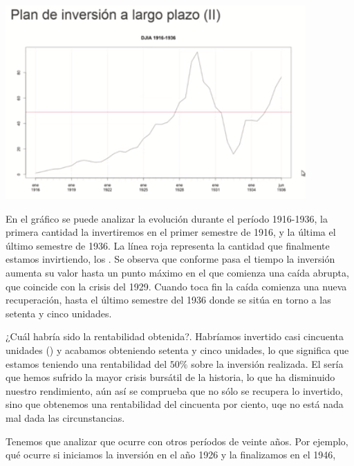 \begin{center}
    \includegraphics[scale=.65]{images/mod03-05.png}
\end{center}
En el gráfico se puede analizar la evolución durante el período 1916-1936, la primera cantidad la invertiremos en el primer semestre de 1916, y la última el último semestre de 1936. La línea roja representa la cantidad que finalmente estamos invirtiendo, los . Se observa que conforme pasa el tiempo la inversión aumenta su valor hasta un punto máximo en el que comienza una caída abrupta, que coincide con la crisis del 1929. Cuando toca fin la caída comienza una nueva recuperación, hasta el último semestre del 1936 donde se sitúa en torno a las setenta y cinco unidades.

¿Cuál habría sido la rentabilidad obtenida?. Habríamos invertido casi cincuenta unidades () y acabamos obteniendo setenta y cinco unidades, lo que significa que estamos teniendo una rentabilidad del $50\%$ sobre la inversión realizada. El  sería que hemos sufrido la mayor crisis bursátil de la historia, lo que ha disminuido nuestro rendimiento, aún así se comprueba que no sólo se recupera lo invertido, sino que obtenemos una rentabilidad del cincuenta por ciento, uqe no está nada mal dada las circunstancias.

Tenemos que analizar que ocurre con otros períodos de veinte años. Por ejemplo, qué ocurre si iniciamos la inversión en el año 1926 y la finalizamos en el 1946,


